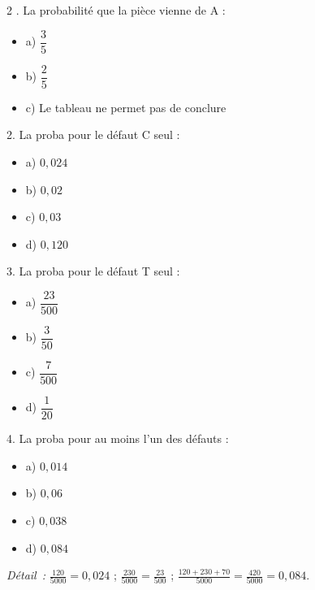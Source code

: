 \documentclass[11pt,a4paper]{article}
\newcommand{\cor}[1]{%
  \begin{tcolorbox}[
    colback=blue!5!white,
    colframe=blue!70!black,
    boxrule=1pt,
    arc=3pt,
    left=4pt, right=4pt, top=3pt, bottom=3pt,
    before skip=2mm, after skip=3mm
  ]
  \color{blue!80!black}#1
  \end{tcolorbox}%
}
\newcommand{\ans}[1]{\textcolor{blue!80!black}{\textbf{#1}}}
\begin{document}
\begin{multicols}{2}
. La probabilité que la pièce vienne de A :
\begin{itemize}[label=$\square$]
  \item \ans{} a) $\dfrac{3}{5}$
  \item b) $\dfrac{2}{5}$
  \item c) Le tableau ne permet pas de conclure
\end{itemize}

2. La proba pour le défaut C seul :
\begin{itemize}[label=$\square$]
  \item \ans{} a) $0{,}024$
  \item b) $0{,}02$
  \item c) $0{,}03$
  \item d) $0{,}120$
\end{itemize}

\columnbreak

3. La proba pour le défaut T seul :
\begin{itemize}[label=$\square$]
  \item \ans{} a) $\dfrac{23}{500}$
  \item b) $\dfrac{3}{50}$
  \item c) $\dfrac{7}{500}$
  \item d) $\dfrac{1}{20}$
\end{itemize}

4. La proba pour au moins l'un des défauts :
\begin{itemize}[label=$\square$]
  \item a) $0{,}014$
  \item b) $0{,}06$
  \item c) $0{,}038$
  \item \ans{} d) $0{,}084$
\end{itemize}
\end{multicols}

\cor{\textit{Détail~:} $\frac{120}{5000}=0{,}024$ ; $\frac{230}{5000}=\frac{23}{500}$ ; $\frac{120+230+70}{5000}=\frac{420}{5000}=0{,}084$.}

\vfill
\end{document}

